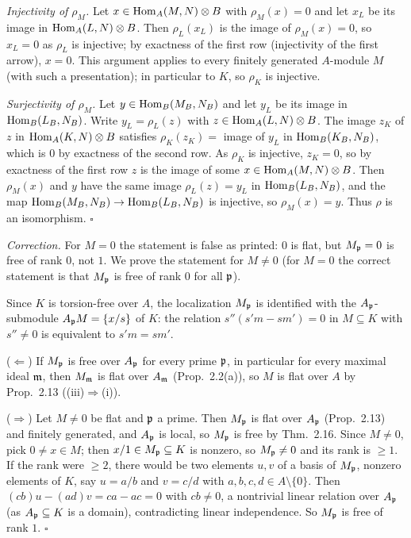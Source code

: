 \documentclass[11pt]{article}
\begin{document}
\emph{Injectivity of $\rho_M$.} Let $x\in\operatorname{Hom}_A(M,N)\otimes B$ with $\rho_M(x)=0$ and let $x_L$ be its image in $\operatorname{Hom}_A(L,N)\otimes B$. Then $\rho_L(x_L)$ is the image of $\rho_M(x)=0$, so $x_L=0$ as $\rho_L$ is injective; by exactness of the first row (injectivity of the first arrow), $x=0$. This argument applies to every finitely generated $A$-module $M$ (with such a presentation); in particular to $K$, so $\rho_K$ is injective.

\emph{Surjectivity of $\rho_M$.} Let $y\in\operatorname{Hom}_B(M_B,N_B)$ and let $y_L$ be its image in $\operatorname{Hom}_B(L_B,N_B)$. Write $y_L=\rho_L(z)$ with $z\in\operatorname{Hom}_A(L,N)\otimes B$. The image $z_K$ of $z$ in $\operatorname{Hom}_A(K,N)\otimes B$ satisfies $\rho_K(z_K)=$ image of $y_L$ in $\operatorname{Hom}_B(K_B,N_B)$, which is $0$ by exactness of the second row. As $\rho_K$ is injective, $z_K=0$, so by exactness of the first row $z$ is the image of some $x\in\operatorname{Hom}_A(M,N)\otimes B$. Then $\rho_M(x)$ and $y$ have the same image $\rho_L(z)=y_L$ in $\operatorname{Hom}_B(L_B,N_B)$, and the map $\operatorname{Hom}_B(M_B,N_B)\to\operatorname{Hom}_B(L_B,N_B)$ is injective, so $\rho_M(x)=y$. Thus $\rho$ is an isomorphism. \hfill$\square$

\pf
\emph{Correction.} For $M=0$ the statement is false as printed: $0$ is flat, but $M_\mathfrak p=0$ is free of rank $0$, not $1$. We prove the statement for $M\neq0$ (for $M=0$ the correct statement is that $M_\mathfrak p$ is free of rank $0$ for all $\mathfrak p$).

Since $K$ is torsion-free over $A$, the localization $M_\mathfrak p$ is identified with the $A_\mathfrak p$-submodule $A_\mathfrak p M=\{x/s\}$ of $K$: the relation $s''(s'm-sm')=0$ in $M\subseteq K$ with $s''\ne0$ is equivalent to $s'm=sm'$.

($\Leftarrow$) If $M_\mathfrak p$ is free over $A_\mathfrak p$ for every prime $\mathfrak p$, in particular for every maximal ideal $\mathfrak m$, then $M_\mathfrak m$ is flat over $A_\mathfrak m$ (Prop.~2.2(a)), so $M$ is flat over $A$ by Prop.~2.13 ((iii)$\Rightarrow$(i)).

($\Rightarrow$) Let $M\neq0$ be flat and $\mathfrak p$ a prime. Then $M_\mathfrak p$ is flat over $A_\mathfrak p$ (Prop.~2.13) and finitely generated, and $A_\mathfrak p$ is local, so $M_\mathfrak p$ is free by Thm.~2.16. Since $M\ne0$, pick $0\ne x\in M$; then $x/1\in M_\mathfrak p\subseteq K$ is nonzero, so $M_\mathfrak p\ne0$ and its rank is $\ge1$. If the rank were $\ge2$, there would be two elements $u,v$ of a basis of $M_\mathfrak p$, nonzero elements of $K$, say $u=a/b$ and $v=c/d$ with $a,b,c,d\in A\setminus\{0\}$. Then $(cb)u-(ad)v=ca-ac=0$ with $cb\neq0$, a nontrivial linear relation over $A_\mathfrak p$ (as $A_\mathfrak p\subseteq K$ is a domain), contradicting linear independence. So $M_\mathfrak p$ is free of rank $1$. \hfill$\square$
\end{document}
